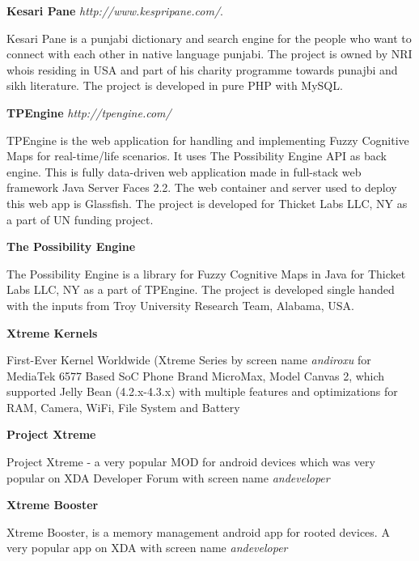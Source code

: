 \documentclass[margin,line]{res}
\begin{document}
\begin{resume}
\textbf{Kesari Pane} {\em http://www.kespripane.com/}.

Kesari Pane is a punjabi dictionary and search engine for the people who want to connect with each other in native language punjabi. The project is owned by NRI whois residing in USA and part of his charity programme towards punajbi and sikh literature. The project is developed in pure PHP with MySQL. 

\textbf{TPEngine} {\em http://tpengine.com/} 

TPEngine is the web application for handling and implementing Fuzzy Cognitive Maps for real-time/life scenarios. It uses The Possibility Engine API as back engine. This is fully data-driven web application made in full-stack web framework Java Server Faces 2.2. The web container and server used to deploy this web app is Glassfish. The project is developed for Thicket Labs LLC, NY as a part of UN funding project.

\textbf{The Possibility Engine} 

The Possibility Engine is a library for Fuzzy Cognitive Maps in Java for Thicket Labs LLC, NY as a part of TPEngine. The project is developed single handed with the inputs from Troy University Research Team, Alabama, USA.

\textbf{Xtreme Kernels} 

First-Ever Kernel Worldwide (Xtreme Series by screen name \textit{andiroxu} for MediaTek 6577 Based SoC Phone Brand MicroMax, Model Canvas 2, which supported Jelly Bean (4.2.x-4.3.x) with multiple features and optimizations for RAM, Camera, WiFi, File System and Battery 

\textbf{Project Xtreme} 

Project Xtreme - a very popular MOD for android devices which was very popular on XDA Developer Forum with screen name \textit{andeveloper}

\textbf{Xtreme Booster} 

Xtreme Booster, is a memory management android app for rooted devices. A very popular app on XDA with screen name \textit{andeveloper}



\end{resume}
\end{document}
